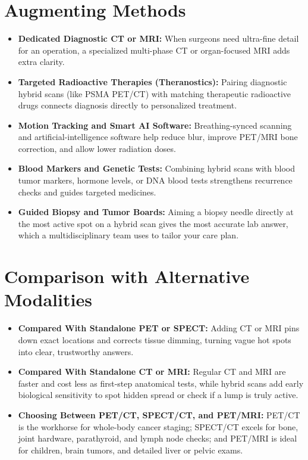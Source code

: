 \section{Augmenting Methods}
\begin{itemize}
    \item \textbf{Dedicated Diagnostic CT or MRI:} When surgeons need ultra-fine detail for an operation, a specialized multi-phase CT or organ-focused MRI adds extra clarity.
    \item \textbf{Targeted Radioactive Therapies (Theranostics):} Pairing diagnostic hybrid scans (like PSMA PET/CT) with matching therapeutic radioactive drugs connects diagnosis directly to personalized treatment.
    \item \textbf{Motion Tracking and Smart AI Software:} Breathing-synced scanning and artificial-intelligence software help reduce blur, improve PET/MRI bone correction, and allow lower radiation doses.
    \item \textbf{Blood Markers and Genetic Tests:} Combining hybrid scans with blood tumor markers, hormone levels, or DNA blood tests strengthens recurrence checks and guides targeted medicines.
    \item \textbf{Guided Biopsy and Tumor Boards:} Aiming a biopsy needle directly at the most active spot on a hybrid scan gives the most accurate lab answer, which a multidisciplinary team uses to tailor your care plan.
\end{itemize}

\section{Comparison with Alternative Modalities}
\begin{itemize}
    \item \textbf{Compared With Standalone PET or SPECT:} Adding CT or MRI pins down exact locations and corrects tissue dimming, turning vague hot spots into clear, trustworthy answers.
    \item \textbf{Compared With Standalone CT or MRI:} Regular CT and MRI are faster and cost less as first-step anatomical tests, while hybrid scans add early biological sensitivity to spot hidden spread or check if a lump is truly active.
    \item \textbf{Choosing Between PET/CT, SPECT/CT, and PET/MRI:} PET/CT is the workhorse for whole-body cancer staging; SPECT/CT excels for bone, joint hardware, parathyroid, and lymph node checks; and PET/MRI is ideal for children, brain tumors, and detailed liver or pelvic exams.
\end{itemize}

